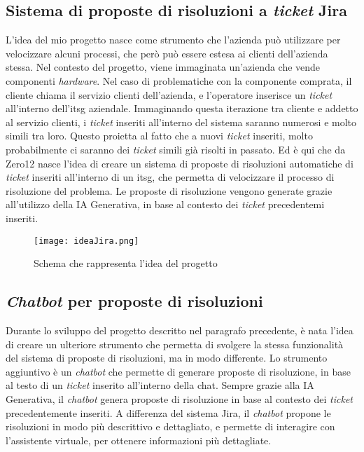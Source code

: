 \subsection{Sistema di proposte di risoluzioni a \textit{ticket} Jira}
L'idea del mio progetto nasce come strumento che l'azienda può utilizzare per velocizzare alcuni processi, che però può essere estesa ai clienti dell'azienda stessa. Nel contesto del progetto, viene immaginata un'azienda che vende componenti \textit{hardware}. 
Nel caso di problematiche con la componente comprata, il cliente chiama il servizio clienti dell'azienda, e l'operatore inserisce un \textit{ticket} all'interno dell'\gls{itsg} aziendale. Immaginando questa iterazione tra cliente e addetto al servizio clienti, i \textit{ticket} inseriti all'interno del sistema saranno numerosi e molto simili tra loro. 
Questo proietta al fatto che a nuovi \textit{ticket} inseriti, molto probabilmente ci saranno dei \textit{ticket} simili già risolti in passato. 
Ed è qui che da Zero12 nasce l'idea di creare un sistema di proposte di risoluzioni automatiche di \textit{ticket} inseriti all'interno di un \gls{itsg}, che permetta di velocizzare il processo di risoluzione del problema. Le proposte di risoluzione vengono generate grazie all'utilizzo della IA Generativa, in base al contesto dei \textit{ticket} precedentemi inseriti.

\begin{figure}[H]
    \centering
    \texttt{[image: ideaJira.png]}
    \caption{Schema che rappresenta l'idea del progetto}
    \label{fig:ideaJira}
\end{figure}
\subsection{\textit{Chatbot} per proposte di risoluzioni}
Durante lo sviluppo del progetto descritto nel paragrafo precedente, è nata l'idea di creare un ulteriore strumento che permetta di svolgere la stessa funzionalità del sistema di proposte di risoluzioni, ma in modo differente. Lo strumento aggiuntivo è un \textit{chatbot} che permette di generare proposte di risoluzione, in base al testo di un \textit{ticket} inserito all'interno della chat. 
Sempre grazie alla IA Generativa, il \textit{chatbot} genera proposte di risoluzione in base al contesto dei \textit{ticket} precedentemente inseriti. A differenza del sistema Jira, il \textit{chatbot} propone le risoluzioni in modo più descrittivo e dettagliato, e permette di interagire con l'assistente virtuale, per ottenere informazioni più dettagliate.
